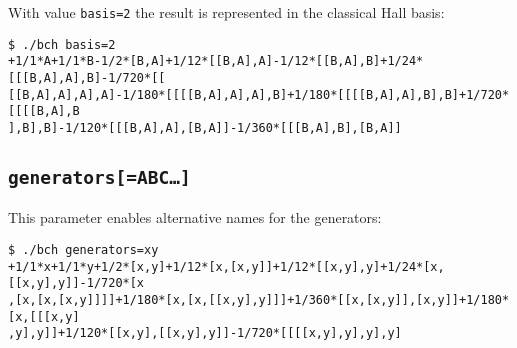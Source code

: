 \documentclass[11pt,a4paper]{article}
\begin{document}
\medskip

\noindent With value \verb|basis=2| the result is represented in the classical Hall basis:

\medskip

{\small\begin{BVerbatim}
$ ./bch basis=2
+1/1*A+1/1*B-1/2*[B,A]+1/12*[[B,A],A]-1/12*[[B,A],B]+1/24*[[[B,A],A],B]-1/720*[[
[[B,A],A],A],A]-1/180*[[[[B,A],A],A],B]+1/180*[[[[B,A],A],B],B]+1/720*[[[[B,A],B
],B],B]-1/120*[[[B,A],A],[B,A]]-1/360*[[[B,A],B],[B,A]]
\end{BVerbatim}
}

\medskip


\subsection*{\tt generators[=\tt ABC\dots]}
This parameter enables alternative names for the generators:
\medskip

{\small\begin{BVerbatim}
$ ./bch generators=xy
+1/1*x+1/1*y+1/2*[x,y]+1/12*[x,[x,y]]+1/12*[[x,y],y]+1/24*[x,[[x,y],y]]-1/720*[x
,[x,[x,[x,y]]]]+1/180*[x,[x,[[x,y],y]]]+1/360*[[x,[x,y]],[x,y]]+1/180*[x,[[[x,y]
,y],y]]+1/120*[[x,y],[[x,y],y]]-1/720*[[[[x,y],y],y],y]
\end{BVerbatim}
}

\medskip
\end{document}

